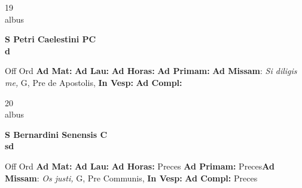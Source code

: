 \documentclass[10pt, openany]{book}
\begin{document}
    \begin{center}
        \begin{minipage}{3.5in}
            \vspace{2em}
            \begin{minipage}{0.5in}
                {\Huge 19} \\
                {\normalsize albus}
            \end{minipage}
            \begin{minipage}{3.0in}
                \textbf{ \large S Petri Caelestini PC \\
                \textnormal{\normalsize d}}

            \end{minipage}
            \begin{justify}Off Ord
                \textbf{Ad Mat: }
                \textbf{Ad Lau: }
                \textbf{Ad Horas: }
                \textbf{Ad Primam: }\textbf{Ad Missam}: \textit{Si diligis me,} G, Pre de Apostolis, 
                \textbf{In Vesp: }
                \textbf{Ad Compl: }
            \end{justify}
        \end{minipage}
    \end{center}

    \begin{center}
        \begin{minipage}{3.5in}
            \vspace{2em}
            \begin{minipage}{0.5in}
                {\Huge 20} \\
                {\normalsize albus}
            \end{minipage}
            \begin{minipage}{3.0in}
                \textbf{ \large S Bernardini Senensis C \\
                \textnormal{\normalsize sd}}

            \end{minipage}
            \begin{justify}Off Ord
                \textbf{Ad Mat: }
                \textbf{Ad Lau: }
                \textbf{Ad Horas: }Preces
                \textbf{Ad Primam: }Preces\textbf{Ad Missam}: \textit{Os justi,} G, Pre Communis, 
                \textbf{In Vesp: }
                \textbf{Ad Compl: }Preces
            \end{justify}
        \end{minipage}
    \end{center}
\end{document}
